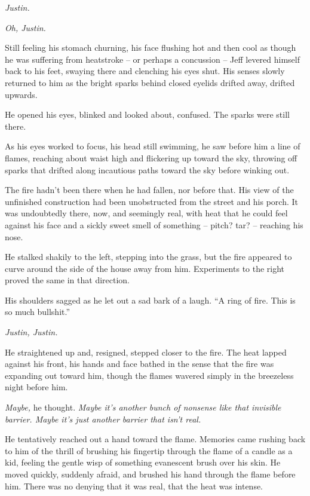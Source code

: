 \textit{Justin.}

\textit{Oh, Justin.}

\secdiv

Still feeling his stomach churning, his face flushing hot and then cool as though he was suffering from heatstroke -- or perhaps a concussion -- Jeff levered himself back to his feet, swaying there and clenching his eyes shut.  His senses slowly returned to him as the bright sparks behind closed eyelids drifted away, drifted upwards.

He opened his eyes, blinked and looked about, confused.  The sparks were still there.

As his eyes worked to focus, his head still swimming, he saw before him a line of flames, reaching about waist high and flickering up toward the sky, throwing off sparks that drifted along incautious paths toward the sky before winking out.

The fire hadn't been there when he had fallen, nor before that.  His view of the unfinished construction had been unobstructed from the street and his porch.  It was undoubtedly there, now, and seemingly real, with heat that he could feel against his face and a sickly sweet smell of something -- pitch? tar? -- reaching his nose.

He stalked shakily to the left, stepping into the grass, but the fire appeared to curve around the side of the house away from him.  Experiments to the right proved the same in that direction.

His shoulders sagged as he let out a sad bark of a laugh.  ``A ring of fire.  This is so much bullshit.''

\textit{Justin, Justin.}

He straightened up and, resigned, stepped closer to the fire.  The heat lapped against his front, his hands and face bathed in the sense that the fire was expanding out toward him, though the flames wavered simply in the breezeless night before him.

\textit{Maybe,} he thought. \textit{Maybe it's another bunch of nonsense like that invisible barrier.  Maybe it's just another barrier that isn't real.}

He tentatively reached out a hand toward the flame.  Memories came rushing back to him of the thrill of brushing his fingertip through the flame of a candle as a kid, feeling the gentle wisp of something evanescent brush over his skin.  He moved quickly, suddenly afraid, and brushed his hand through the flame before him.  There was no denying that it was real, that the heat was intense.


